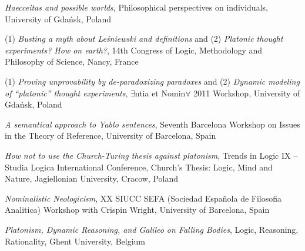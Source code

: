 \documentclass[10pt, a4paper]{article}
\newcommand{\years}[1]{\marginnote{\normalsize #1}}
\begin{document}
\vspace{0.5mm}



\years{2011} \emph{Haecceitas and possible worlds}, Philosophical perspectives on individuals,  University of Gda\'nsk, Poland


\vspace{0.5mm}






(1) \emph{Busting a myth about Le\' sniewski and definitions} and (2) \emph{Platonic thought experiments? How on earth?}, 14th Congress of Logic, Methodology and Philosophy of Science,  Nancy, France


\vspace{0.5mm}


(1) \emph{Proving unprovability by de-paradoxizing paradoxes} and (2) \emph{Dynamic modeling of ``platonic'' thought experiments}, $\exists$ntia et Nomin$\forall$ 2011 Workshop,  University of Gda\' nsk, Poland





\vspace{0.5mm}



\emph{A semantical approach to Yablo sentences}, Seventh Barcelona Workshop on Issues in the Theory of Re\-fe\-ren\-ce,  University of Barcelona, Spain


\vspace{0.5mm}


\emph{How not to use the Church-Turing thesis against platonism}, Trends in Logic IX -- Studia Logica International Conference, Church's Thesis: Logic, Mind and Nature,  Jagiellonian University, Cracow, Poland


\vspace{0.5mm}


 \emph{Nominalistic Neologicism},  XX SIUCC SEFA (Sociedad Espa\~ nola de Filosofia Analitica) Workshop with Crispin Wright,    University of  Barcelona, Spain


\vspace{0.5mm}



\years{2010} \emph{Platonism,   Dynamic   Reasoning,   and   Galileo   on   Falling   Bodies}, Logic,   Reasoning,   Rationality,  Ghent   University,
Belgium



\vspace{0.5mm}
\end{document}
